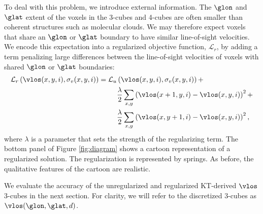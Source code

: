 To deal with this problem, we introduce external information.
The $\glon$ and $\glat$ extent of the voxels in the 3-cubes and 4-cubes are often smaller than coherent structures such as molecular clouds. 
We may therefore expect voxels that share an $\glon$ or $\glat$ boundary to have similar line-of-sight velocities.
We encode this expectation into a regularized objective function, $\mathcal{L}_r$, by adding a term penalizing large differences between the line-of-sight velocities of voxels with shared $\glon$ or $\glat$ boundaries:
\begin{equation}
  \label{eqn:obj_reg}
  \begin{split}
  \mathcal{L}_r\left(\vlos(x, y, i), \sigma_v(x, y, i) \right) = 
  \mathcal{L}_u & \left(\vlos(x, y, i), \sigma_v(x, y, i) \right) + \\
  & \frac{\lambda}{2} \sum_{x, y} \left( \vlos(x + 1, y, i) - \vlos(x, y, i) \right)^2 +\\
  & \frac{\lambda}{2} \sum_{x, y} \left( \vlos(x, y + 1, i) - \vlos(x, y, i) \right)^2,
  \end{split}
\end{equation}
where $\lambda$ is a parameter that sets the strength of the regularizing term. 
The bottom panel of Figure \ref{fig:diagram} shows a cartoon representation of a regularized solution. 
The regularization is represented by springs. 
As before, the qualitative features of the cartoon are realistic. 

We evaluate the accuracy of the unregularized and regularized KT-derived $\vlos$ 3-cubes in the next section. 
For clarity, we will refer to the discretized 3-cubes as $\vlos(\glon, \glat, d)$. 
